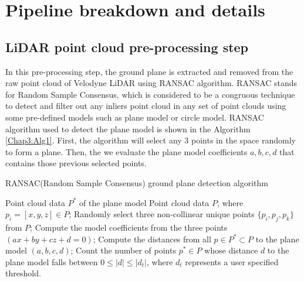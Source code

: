 \section{Pipeline breakdown and details}

\subsection{LiDAR point cloud pre-processing step}
\label{pre-processing_step_section}

In this pre-processing step, the ground plane is extracted and removed from the
raw point cloud of Velodyne LiDAR using RANSAC algorithm. RANSAC \cite{ransac} stands for Random Sample
Consensus, which is considered to be a congruous technique to detect and filter out any inliers point cloud
in any set of point clouds using some pre-defined models such as plane model or circle model. RANSAC algorithm used to detect
the plane model is shown in the Algorithm \ref{Chap3:Alg1}. First, the algorithm will select any 3 points in the space randomly to form
a plane. Then, the we evaluate the plane model coefficients $a,b,c,d$ that contains those previous selected points.


\begin{algorithm}[h]
    \caption{RANSAC(Random Sample Consensus) ground plane detection algorithm  \cite{ransac}}
    \label{Chap3:Alg1}
    \begin{algorithmic}[1]
        \Ensure Point cloud data $P^*$ of the plane model
        \Require Point cloud data $P$, where $p_i=[x,y,z] \in P$;
        \State Randomly select three non-collinear unique points $\{p_i, p_j, p_k\}$ from $P$;
        \State Compute the model coefficients from the three points $(ax + by + cz + d = 0)$;
        \State Compute the distances from all $p \in P^* \subset P$ to the plane model $(a,b,c,d)$;
        \State Count the number of points $p^* \in P$ whose distance $d$ to the plane model falls between $0 \leq |d| \leq |d_t|$, where $d_t$ represents a user specified threshold.
    \end{algorithmic}
\end{algorithm}



